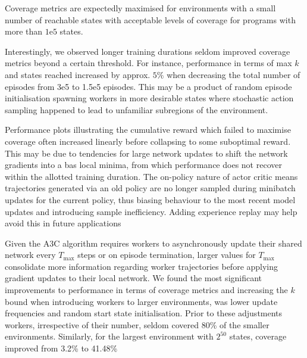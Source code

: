 \documentclass[runningheads]{llncs}
\begin{document}
Coverage metrics are expectedly maximised for environments with a small number of reachable states with acceptable levels of coverage for programs with more than $1\mathrm{e}{5}$ states. 


Interestingly, we observed longer training durations seldom improved coverage metrics beyond a certain threshold. For instance, performance in terms of max $k$ and states reached increased by approx. $5\%$ when decreasing the total number of episodes from 3e5 to 1.5e5 episodes. This may be a product of random episode initialisation spawning workers in more desirable states where stochastic action sampling happened to lead to unfamiliar subregions of the environment. 

Performance plots illustrating the cumulative reward  which failed to maximise coverage often increased linearly before collapsing to some suboptimal reward. This may be due to tendencies for large network updates to shift the network gradients into a bas local minima, from which performance does not recover within the allotted training duration. The on-policy nature of actor critic means trajectories generated via an old policy are no longer sampled during minibatch updates for the current policy,  thus biasing behaviour to the most recent model updates and introducing sample inefficiency. Adding experience replay \cite{wang2017sample} may help avoid this in future applications

Given the A3C algorithm requires workers to asynchronously update their shared network every $T_{\max}$ steps or on episode termination, larger values for $T_{\max}$ consolidate more information regarding worker trajectories before applying gradient updates to their local network. We found the most significant improvements to performance in terms of coverage metrics and increasing the $k$ bound when introducing workers to larger environments, was lower update frequencies and random start state initialisation. Prior to these adjustments workers, irrespective of their number, seldom covered 80\% of the smaller environments. Similarly, for the largest environment with $2^{50}$ states, coverage improved from 3.2\% to 41.48\%
\end{document}
